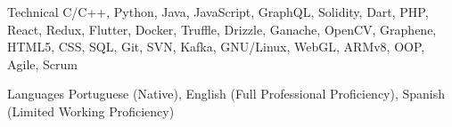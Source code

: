 
\begin{cvskills}
  \cvskill
    {Technical} %
    {C/C++, Python, Java, JavaScript, GraphQL, Solidity, Dart, PHP, React, Redux, Flutter, Docker, Truffle, Drizzle, Ganache, OpenCV, Graphene, HTML5, CSS, SQL, Git, SVN, Kafka, GNU/Linux, WebGL, ARMv8, OOP, Agile, Scrum} %

  \cvskill
    {Languages} %
    {Portuguese (Native), English (Full Professional Proficiency), Spanish (Limited Working Proficiency)} %

\end{cvskills}
